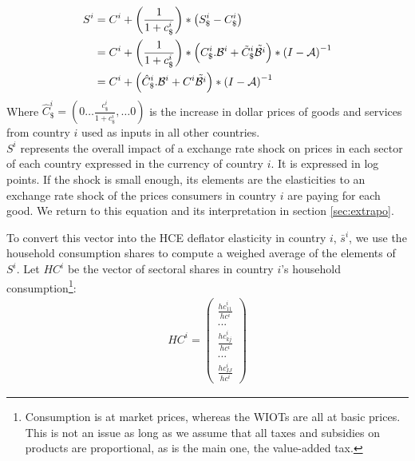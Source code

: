 \documentclass[12pt,a4paper]{paper}
\begin{document}
\begin{equation}
\begin{aligned}
	S^i&=C^i  + \left( \frac{1}{1+{{c}_\$^i}}\right)*\left({S_\$^i}-{{C}_{\$}^i}\right)\\
	&=C^i + \left( \frac{1}{1+{{c}_\$^i}}\right)*\left(C_\$^i.{\cal B}^i+{\tilde{C}_\$^i}{\tilde{{\cal B}^i}}\right)*{{(I-{\cal A})}^{-1}} 	\\
	&=C^i	+ \left(\hat{C}^i_\$.{\cal B}^i+{C^i}{\tilde{{\cal B}^i}}\right)*{{(I-{\cal A})}^{-1}}	
\label{eq:eqdomcurrency}
\end{aligned}
\end{equation}
Where $\hat{C}^i_\$=\left(0 \ldots \frac{c_\$^i}{1+c_\$^i},\ldots 0 \right)$ is the increase in dollar prices of goods and services from country $i$ used as inputs in all other countries.\\ 
$S^i$ represents the overall impact of a exchange rate shock on prices in each sector of each country expressed in the currency of country $i$. It is expressed in log points. If the shock is small enough, its elements are the elasticities to an exchange rate shock of the prices consumers in country $i$ are paying for each good.
We return to this equation and its interpretation in section  \ref{sec:extrapo}.

To convert this vector into the HCE deflator elasticity in country $i$, $\bar{s}^i$, we use the household consumption shares to compute a weighed average of the elements of $S^i$.
Let $HC^i$ be the vector of sectoral shares in country $i$'s household consumption\footnote{Consumption is at market prices, whereas the WIOTs are all at basic prices. This is not an issue as long as we assume that all taxes and subsidies on products are proportional, as is the main one, the value-added tax.}:
\begin{eqnarray*}
HC^i=\left( 
	\begin{array}{c}
	\frac{{hc}_{11}^i}{hc^i} \\
	...\\
	\frac{{hc}_{kj}^i}{hc^i}\\
	...\\
	\frac{{hc}_{IJ}^i}{hc^i}
	 \end{array}
	 \right)
\end{eqnarray*}
\end{document}
